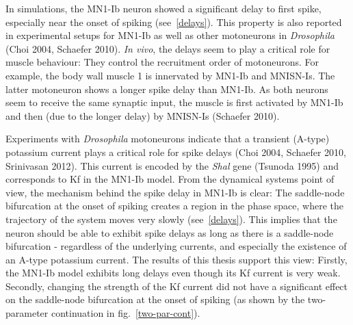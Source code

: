 \documentclass[12pt,a4paper,]{report}
\begin{document}
In simulations, the MN1-Ib neuron showed a significant delay to first
spike, especially near the onset of spiking (see~\ref{delays}). This
property is also reported in experimental setups for MN1-Ib as well as
other motoneurons in \emph{Drosophila} (Choi 2004, Schaefer 2010).
\emph{In vivo}, the delays seem to play a critical role for muscle
behaviour: They control the recruitment order of motoneurons. For
example, the body wall muscle 1 is innervated by MN1-Ib and MNISN-Is.
The latter motoneuron shows a longer spike delay than MN1-Ib. As both
neurons seem to receive the same synaptic input, the muscle is first
activated by MN1-Ib and then (due to the longer delay) by MNISN-Is
(Schaefer 2010).

Experiments with \emph{Drosophila} motoneurons indicate that a transient
(A-type) potassium current plays a critical role for spike delays (Choi
2004, Schaefer 2010, Srinivasan 2012). This current is encoded by the
\emph{Shal} gene (Tsunoda 1995) and corresponds to Kf in the MN1-Ib
model. From the dynamical systems point of view, the mechanism behind
the spike delay in MN1-Ib is clear: The saddle-node bifurcation at the
onset of spiking creates a region in the phase space, where the
trajectory of the system moves very slowly (see~\ref{delays}). This
implies that the neuron should be able to exhibit spike delays as long
as there is a saddle-node bifurcation - regardless of the underlying
currents, and especially the existence of an A-type potassium current.
The results of this thesis support this view: Firstly, the MN1-Ib model
exhibits long delays even though its Kf current is very weak. Secondly,
changing the strength of the Kf current did not have a significant
effect on the saddle-node bifurcation at the onset of spiking (as shown
by the two-parameter continuation in fig.~\ref{two-par-cont}).
\end{document}
